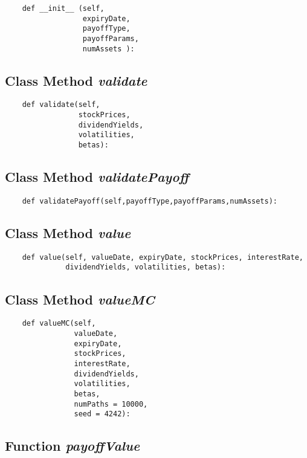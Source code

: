 \documentclass[twoside,11pt]{book}
\begin{document}
\begin{lstlisting}
    def __init__ (self,
                  expiryDate,
                  payoffType,
                  payoffParams,
                  numAssets ):
\end{lstlisting}

\subsection{Class Method {\it validate}}


\begin{lstlisting}
    def validate(self, 
                 stockPrices,
                 dividendYields,
                 volatilities, 
                 betas):
\end{lstlisting}

\subsection{Class Method {\it validatePayoff}}


\begin{lstlisting}
    def validatePayoff(self,payoffType,payoffParams,numAssets):
\end{lstlisting}

\subsection{Class Method {\it value}}


\begin{lstlisting}
    def value(self, valueDate, expiryDate, stockPrices, interestRate,
              dividendYields, volatilities, betas):
\end{lstlisting}

\subsection{Class Method {\it valueMC}}


\begin{lstlisting}
    def valueMC(self, 
                valueDate,
                expiryDate,
                stockPrices,
                interestRate,
                dividendYields,
                volatilities,
                betas,
                numPaths = 10000,
                seed = 4242):
\end{lstlisting}

\subsection{Function {\it payoffValue}}
\end{document}

